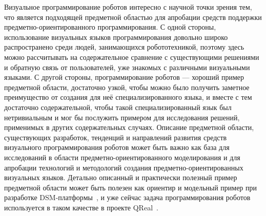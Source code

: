 \documentclass[a4paper]{article}
\begin{document}
Визуальное программирование роботов интересно с научной точки зрения тем, что является подходящей предметной областью для апробации средств поддержки предметно-ориентированного программирования. С одной стороны, использование визуальных языков программирования довольно широко распространено среди людей, занимающихся робототехникой, поэтому здесь можно рассчитывать на содержательное сравнение с существующими решениями и обратную связь от пользователей, уже знакомых с различными визуальными языками. С другой стороны, программирование роботов --- хороший пример предметной области, достаточно узкой, чтобы можно было получить заметное преимущество от создания для неё специализированного языка, и вместе с тем достаточно содержательной, чтобы такой специализированный язык был нетривиальным и мог бы послужить примером для исследования решений, применимых в других содержательных случаях. Описание предметной области, существующих разработок, тенденций и направлений развития средств визуального программирования роботов может быть важно как база для исследований в области предметно-ориентированного моделирования и для апробации технологий и методологий создания предметно-ориентированных визуальных языков. Детально описанный и практически полезный пример предметной области может быть полезен как ориентир и модельный пример при разработке DSM-платформы~\cite{dsmPlatforms}, и уже сейчас задача программирования роботов используется в таком качестве в проекте QReal~\cite{qReal}.
\end{document}
